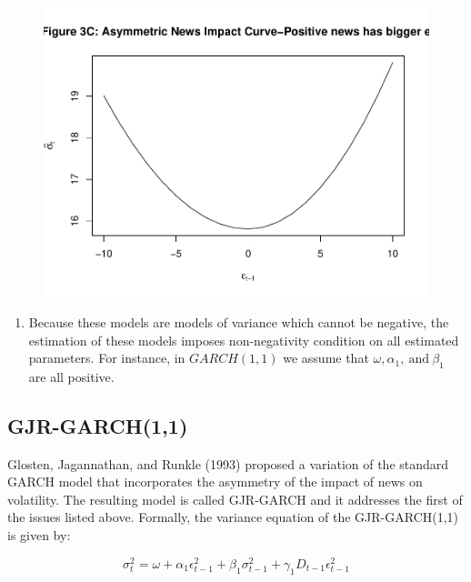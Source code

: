 \documentclass[]{book}
\providecommand{\tightlist}{%
  \setlength{\itemsep}{0pt}\setlength{\parskip}{0pt}}
\theoremstyle{definition}
\theoremstyle{definition}
\theoremstyle{definition}
\theoremstyle{remark}
\begin{document}
\begin{figure}

{\centering \includegraphics[width=1\linewidth]{bookdown-demo_files/figure-latex/ch7-figure2-3} 

}

\end{figure}

\begin{enumerate}
\def\labelenumi{\arabic{enumi}.}
\setcounter{enumi}{1}
\tightlist
\item
  Because these models are models of variance which cannot be negative,
  the estimation of these models imposes non-negativity condition on all
  estimated parameters. For instance, in \(GARCH(1,1)\) we assume that
  \(\omega, \alpha_1, \ \text{and} \ \beta_1\) are all positive.
\end{enumerate}

\hypertarget{gjr-garch11}{%
\subsection{GJR-GARCH(1,1)}\label{gjr-garch11}}

Glosten, Jagannathan, and Runkle (1993) proposed a variation of the
standard GARCH model that incorporates the asymmetry of the impact of
news on volatility. The resulting model is called GJR-GARCH and it
addresses the first of the issues listed above. Formally, the variance
equation of the GJR-GARCH(1,1) is given by:

\[ \sigma_t^2=\omega+\alpha_1 \epsilon^2_{t-1}+\beta_1 \sigma^2_{t-1}+\gamma_1 D_{t-1}\epsilon^2_{t-1}\]
\end{document}
